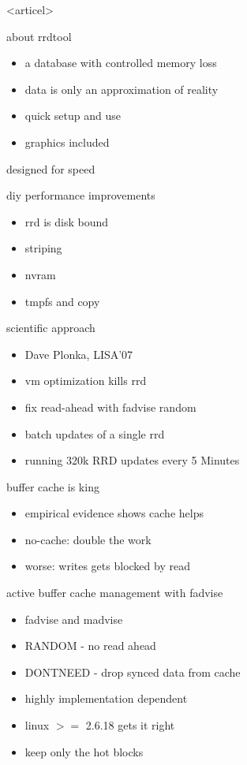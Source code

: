 \mode<articel>{\tableofcontents}

\begin{frame}{about rrdtool}
\begin{itemize}
\item a database with controlled memory loss
\item data is only an approximation of reality
\item quick setup and use
\item graphics included
\end{itemize}
\end{frame}

\begin{frame}{designed for speed}
\end{frame}

\begin{frame}{diy performance improvements}
\begin{itemize}
\item rrd is disk bound
\item striping
\item nvram
\item tmpfs and copy
\end{itemize}
\end{frame}

\begin{frame}{scientific approach}
\begin{itemize}
\item Dave Plonka, LISA'07
\item vm optimization kills rrd
\item fix read-ahead with fadvise random
\item batch updates of a single rrd
\item running 320k RRD updates every 5 Minutes
\end{itemize}
\end{frame}

\begin{frame}{buffer cache is king}
\begin{itemize}
\item empirical evidence shows cache helps
\item no-cache: double the work
\item worse: writes gets blocked by read
\end{itemize}
\end{frame}

\begin{frame}{active buffer cache management with fadvise}
\begin{itemize}
\item fadvise and madvise
\item RANDOM - no read ahead
\item DONTNEED - drop synced data from cache
\item highly implementation dependent
\item linux $>=$ 2.6.18 gets it right
\item keep only the hot blocks
\end{itemize}
\end{frame}

